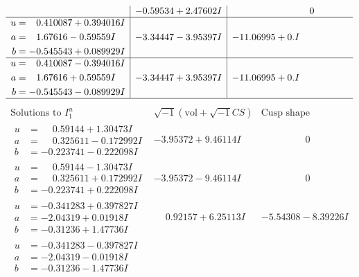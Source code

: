 \documentclass[1p]{elsarticle_modified}
\theoremstyle{definition}
\newcommand{\I}{\sqrt{-1}}
\begin{document}
$$\begin{array}{c|c|c}
 & -0.59534 + 2.47602 I & \phantom{-0.000000 } 0 \\ \hline\begin{aligned}
u &= \phantom{-}0.410087 + 0.394016 I \\
a &= \phantom{-}1.67616 - 0.59559 I \\
b &= -0.545543 + 0.089929 I\end{aligned}
 & -3.34447 - 3.95397 I & -11.06995 + 0. I\phantom{ +0.000000I} \\ \hline\begin{aligned}
u &= \phantom{-}0.410087 - 0.394016 I \\
a &= \phantom{-}1.67616 + 0.59559 I \\
b &= -0.545543 - 0.089929 I\end{aligned}
 & -3.34447 + 3.95397 I & -11.06995 + 0. I\phantom{ +0.000000I}\\
 \hline 
 \end{array}$$\newpage$$\begin{array}{c|c|c}  
\text{Solutions to }I^u_{1}& \I (\text{vol} + \sqrt{-1}CS) & \text{Cusp shape}\\
 \hline 
\begin{aligned}
u &= \phantom{-}0.59144 + 1.30473 I \\
a &= \phantom{-}0.325611 - 0.172992 I \\
b &= -0.223741 - 0.222098 I\end{aligned}
 & -3.95372 + 9.46114 I & \phantom{-0.000000 } 0 \\ \hline\begin{aligned}
u &= \phantom{-}0.59144 - 1.30473 I \\
a &= \phantom{-}0.325611 + 0.172992 I \\
b &= -0.223741 + 0.222098 I\end{aligned}
 & -3.95372 - 9.46114 I & \phantom{-0.000000 } 0 \\ \hline\begin{aligned}
u &= -0.341283 + 0.397827 I \\
a &= -2.04319 + 0.01918 I \\
b &= -0.31236 + 1.47736 I\end{aligned}
 & \phantom{-}0.92157 + 6.25113 I & -5.54308 - 8.39226 I \\ \hline\begin{aligned}
u &= -0.341283 - 0.397827 I \\
a &= -2.04319 - 0.01918 I \\
b &= -0.31236 - 1.47736 I\end{aligned}

\end{array}$$
\end{document}
